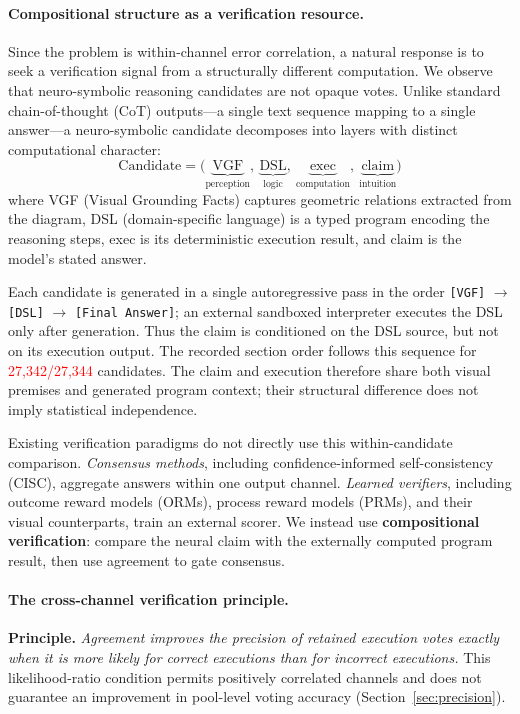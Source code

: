 \documentclass{article}
\newcommand{\recheck}[1]{\textcolor{red}{#1}}
\begin{document}
\paragraph{Compositional structure as a verification resource.}
Since the problem is within-channel error correlation, a natural response is to seek a verification signal from a structurally different computation. We observe that neuro-symbolic reasoning candidates are not opaque votes. Unlike standard chain-of-thought (CoT) outputs---a single text sequence mapping to a single answer---a neuro-symbolic candidate decomposes into layers with distinct computational character:
\begin{equation}
    \text{Candidate} = \big(\underbrace{\text{VGF}}_{\text{perception}},\ \underbrace{\text{DSL}}_{\text{logic}},\ \underbrace{\text{exec}}_{\text{computation}},\ \underbrace{\text{claim}}_{\text{intuition}}\big)
    \label{eq:candidate}
\end{equation}
where VGF (Visual Grounding Facts) captures geometric relations extracted from the diagram, DSL (domain-specific language) is a typed program encoding the reasoning steps, exec is its deterministic execution result, and claim is the model's stated answer.

Each candidate is generated in a single autoregressive pass in the order \texttt{[VGF]} $\rightarrow$ \texttt{[DSL]} $\rightarrow$ \texttt{[Final Answer]}; an external sandboxed interpreter executes the DSL only after generation. Thus the claim is conditioned on the DSL source, but not on its execution output. The recorded section order follows this sequence for \recheck{27,342/27,344} candidates. The claim and execution therefore share both visual premises and generated program context; their structural difference does not imply statistical independence.

Existing verification paradigms do not directly use this within-candidate comparison. \emph{Consensus methods}, including confidence-informed self-consistency (CISC), aggregate answers within one output channel. \emph{Learned verifiers}, including outcome reward models (ORMs), process reward models (PRMs), and their visual counterparts, train an external scorer. We instead use \textbf{compositional verification}: compare the neural claim with the externally computed program result, then use agreement to gate consensus.

\paragraph{The cross-channel verification principle.}
\textbf{Principle.} \emph{Agreement improves the precision of retained execution votes exactly when it is more likely for correct executions than for incorrect executions.} This likelihood-ratio condition permits positively correlated channels and does not guarantee an improvement in pool-level voting accuracy (Section~\ref{sec:precision}).
\end{document}

